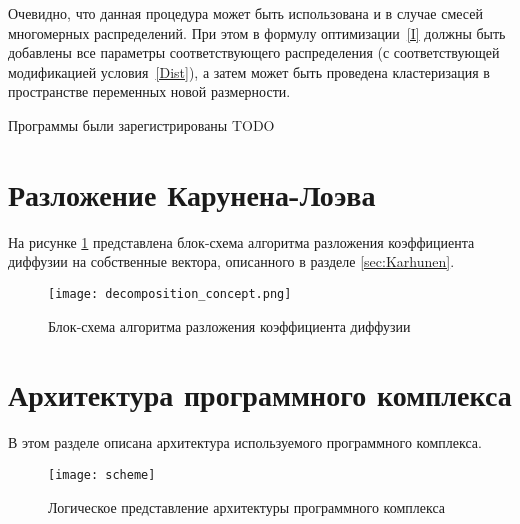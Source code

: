 Очевидно, что данная процедура может быть использована и в случае смесей многомерных распределений. При этом в формулу оптимизации~\eqref{I} должны быть добавлены все параметры соответствующего распределения (с соответствующей модификацией условия~\eqref{Dist}), а затем может быть проведена кластеризация в пространстве переменных новой размерности.

Программы были зарегистрированы TODO \cite{progbib3, progbib4, progbib5, progbib6}

\section{Разложение Карунена-Лоэва}
\label{sec:AlgoKarhunen}
На рисунке \ref{fig:KarhunenAlgo} представлена блок-схема алгоритма разложения коэффициента диффузии на собственные вектора, описанного в разделе \ref{sec:Karhunen}.
\begin{figure}
	\centering
	\texttt{[image: decomposition\_concept.png]}
	\caption{Блок-схема алгоритма разложения коэффициента диффузии}
	\label{fig:KarhunenAlgo}
\end{figure}



\section{Архитектура программного комплекса}
В этом разделе описана архитектура используемого программного комплекса.


\begin{figure}[!h]
	\centering
	\texttt{[image: scheme]}
	\caption{Логическое представление архитектуры программного комплекса}\label{fig:app_scheme}
\end{figure}



